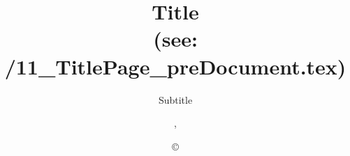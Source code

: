 %
\providecommand{\DenKrTPVersion}{}%
%
%
%
\title[Short Title]{Title\\{\footnotesize(see: \textquotedbl\DenKrLayoutRootDirPATH/11\_TitlePage\_preDocument.tex\textquotedbl)}}%
\subtitle{Subtitle}%
\author{\DenKrTPauthorLast, \DenKrTPauthorFirst}%
\date[\DenKrTPdate]{\copyright \DenKrTPdate}%
\keywords{\TitlePageDataKeywords}%
\subject{\DenKrTPpublicationType}%